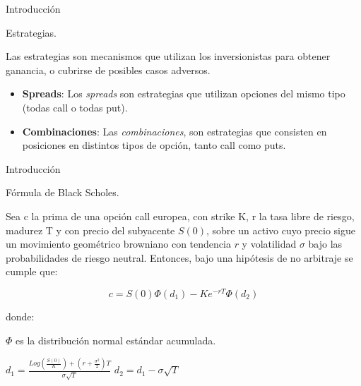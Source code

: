 \documentclass{beamer}
\begin{document}
\begin{frame}{Introducci\'on}

    \begin{block}{Estrategias.}

    Las estrategias son mecanismos que utilizan los inversionistas para obtener ganancia,
    o cubrirse de posibles casos adversos.

    \begin{itemize}
        \item \textbf{Spreads}: Los \textit{spreads} son estrategias que utilizan opciones del mismo tipo (todas call o todas put).
        \item \textbf{Combinaciones}: Las \textit{combinaciones}, son estrategias que consisten en posiciones en distintos tipos de opci\'on, tanto call como puts.
    \end{itemize}    

    \end{block}

\end{frame}

\begin{frame}{Introducci\'on}

    \begin{block}{F\'ormula de Black Scholes.}

    Sea c la prima de una opci\'on call europea, con strike K, r la tasa libre de riesgo, madurez T y con precio del subyacente $S(0)$,
    sobre un activo cuyo precio sigue un movimiento geom\'etrico browniano con tendencia $r$ y
    volatilidad $\sigma$ bajo las probabilidades de riesgo neutral.
    Entonces, bajo una hip\'otesis de no arbitraje se cumple que:


    \begin{equation}
    c = S(0)\Phi(d_1) - Ke^{-rT}\Phi(d_2)
    \end{equation}

    donde:

    $\Phi$ es la distribuci\'on normal est\'andar acumulada.

    $d_1 = \displaystyle\frac{Log \left(\displaystyle\frac{S(0)}{K}\right)+ 
    \left( r + \displaystyle\frac{\sigma^2}{2}\right)T}{\sigma\sqrt{T}}$
    \qquad  $d_2 = d_1 - \sigma\sqrt{T}$


    \end{block}

\end{frame}
\end{document}
